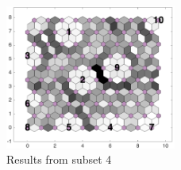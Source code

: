 \begin{figure}
        \centering
         \includegraphics[width=0.5\textwidth]{../../images0.01/M31/2D/image_subsets/subset2_dist_with_hits_t.png}
    \caption{Results from subset 4}
    \label{fig: subset2}
\end{figure}